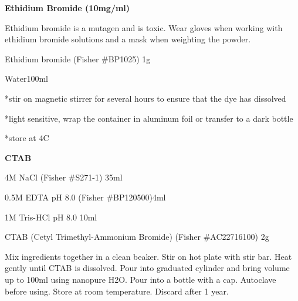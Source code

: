 \documentclass[11pt, oneside]{article}
\begin{document}
		{\bf Ethidium Bromide (10mg/ml)}

		 Ethidium bromide is a mutagen and is toxic. Wear gloves when working with ethidium bromide solutions and a mask 			when weighting the powder. 
		
		\vspace{2mm}
		
			\hspace{2mm}Ethidium bromide (Fisher \#BP1025)	\hspace{2mm}1g

			\hspace{2mm}Water\hspace{56mm}100ml

			\hspace{2mm}*stir on magnetic stirrer for several hours to ensure that the dye has dissolved

			\hspace{2mm}*light sensitive, wrap the container in aluminum foil or transfer to a dark bottle

			\hspace{2mm}*store at 4C

	\newpage

		{\bf CTAB}									

			\hspace{2mm}4M NaCl \hspace{67mm}(Fisher \#S271-1)	\hspace{12mm}	35ml

			\hspace{2mm}0.5M EDTA pH 8.0 \hspace{49mm}(Fisher \#BP120500)\hspace{9mm}4ml

			\hspace{2mm}1M Tris-HCl pH 8.0\hspace{92mm} 10ml

			\hspace{2mm}CTAB (Cetyl Trimethyl-Ammonium Bromide)\hspace{5mm}	(Fisher \#AC22716100)	\hspace{2mm} 2g

			\noindent*Mix ingredients together in a clean beaker. Stir on hot plate with stir bar. Heat gently until CTAB is dissolved. Pour into 				graduated cylinder and bring volume up to 100ml using nanopure H2O. Pour into a bottle with a cap. Autoclave before using. Store at room 			temperature. Discard after 1 year. 

		\vspace{5mm}
\end{document}
